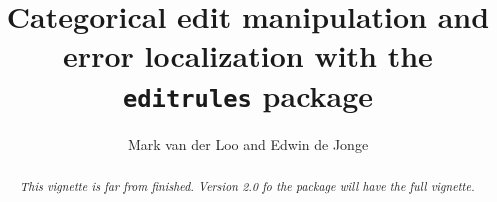 \documentclass[10pt, fleqn, a4paper]{article}
\title{Categorical edit manipulation and error localization with the {\tt editrules} package}
\author{Mark van der Loo and Edwin de Jonge}
\begin{document}
\maketitle
\begin{abstract}
{\em This vignette is far from finished. Version 2.0 fo the package will have
the full vignette.}
\end{abstract}
\end{document}
